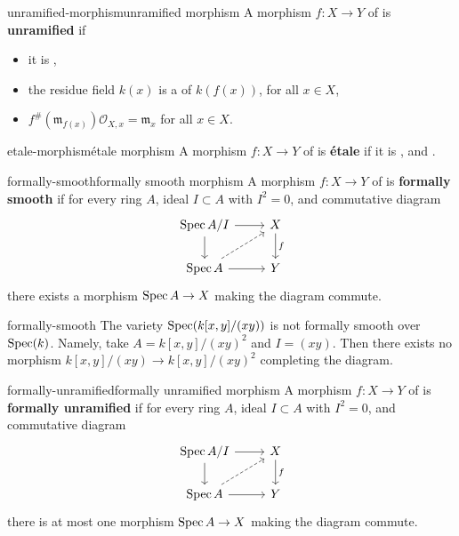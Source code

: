 \begin{topic}{unramified-morphism}{unramified morphism}
    A morphism $f : X \to Y$ of  is \textbf{unramified} if
    \begin{itemize}
        \item it is ,
        \item the residue field $k(x)$ is a  of $k(f(x))$, for all $x \in X$,
        \item $f^\#(\mathfrak{m}_{f(x)}) \mathcal{O}_{X, x} = \mathfrak{m}_x$ for all $x \in X$.
    \end{itemize}
\end{topic}

\begin{topic}{etale-morphism}{étale morphism}
    A morphism $f : X \to Y$ of  is \textbf{étale} if it is ,  and .
\end{topic}

\begin{topic}{formally-smooth}{formally smooth morphism}
    A morphism $f : X \to Y$ of  is \textbf{formally smooth} if for every ring $A$, ideal $I \subset A$ with $I^2 = 0$, and commutative diagram
    \[ \begin{tikzcd} \Spec A/I \arrow{r} \arrow{d} & X \arrow{d}{f} \\ \Spec A \arrow{r} \arrow[dashed]{ur} & Y \end{tikzcd} \]
    there exists a morphism $\operatorname{Spec} A \to X$ making the diagram commute.
\end{topic}

\begin{example}{formally-smooth}
    The variety $\operatorname{Spec}(k[x, y]/(xy))$ is not formally smooth over $\operatorname{Spec}(k)$. Namely, take $A = k[x, y] / (xy)^2$ and $I = (xy)$. Then there exists no morphism $k[x, y]/(xy) \to k[x, y]/(xy)^2$ completing the diagram.
\end{example}

\begin{topic}{formally-unramified}{formally unramified morphism}
    A morphism $f : X \to Y$ of  is \textbf{formally unramified} if for every ring $A$, ideal $I \subset A$ with $I^2 = 0$, and commutative diagram
    \[ \begin{tikzcd} \Spec A/I \arrow{r} \arrow{d} & X \arrow{d}{f} \\ \Spec A \arrow{r} \arrow[dashed]{ur} & Y \end{tikzcd} \]
    there is at most one morphism $\operatorname{Spec} A \to X$ making the diagram commute.
\end{topic}

